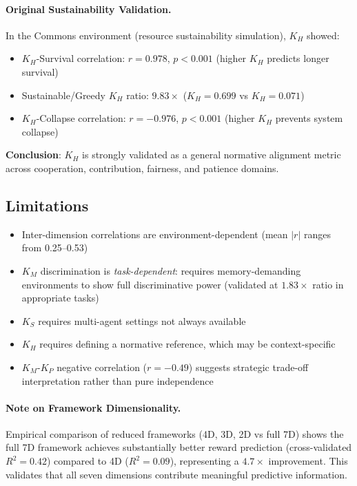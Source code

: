 \documentclass[11pt,a4paper]{article}
\newcommand{\kp}{K_P}
\newcommand{\km}{K_M}
\newcommand{\ks}{K_S}
\newcommand{\kh}{K_H}
\begin{document}
\paragraph{Original Sustainability Validation.} In the Commons environment (resource sustainability simulation), $\kh$ showed:
\begin{itemize}
    \item $\kh$-Survival correlation: $r = 0.978$, $p < 0.001$ (higher $\kh$ predicts longer survival)
    \item Sustainable/Greedy $\kh$ ratio: $9.83\times$ ($\kh = 0.699$ vs $\kh = 0.071$)
    \item $\kh$-Collapse correlation: $r = -0.976$, $p < 0.001$ (higher $\kh$ prevents system collapse)
\end{itemize}

\textbf{Conclusion}: $\kh$ is strongly validated as a general normative alignment metric across cooperation, contribution, fairness, and patience domains.

\subsection{Limitations}

\begin{itemize}
    \item Inter-dimension correlations are environment-dependent (mean $|r|$ ranges from 0.25--0.53)
    \item $\km$ discrimination is \emph{task-dependent}: requires memory-demanding environments to show full discriminative power (validated at $1.83\times$ ratio in appropriate tasks)
    \item $\ks$ requires multi-agent settings not always available
    \item $\kh$ requires defining a normative reference, which may be context-specific
    \item $\km$-$\kp$ negative correlation ($r = -0.49$) suggests strategic trade-off interpretation rather than pure independence
\end{itemize}

\paragraph{Note on Framework Dimensionality.} Empirical comparison of reduced frameworks (4D, 3D, 2D vs full 7D) shows the full 7D framework achieves substantially better reward prediction (cross-validated $R^2 = 0.42$) compared to 4D ($R^2 = 0.09$), representing a $4.7\times$ improvement. This validates that all seven dimensions contribute meaningful predictive information.
\end{document}
